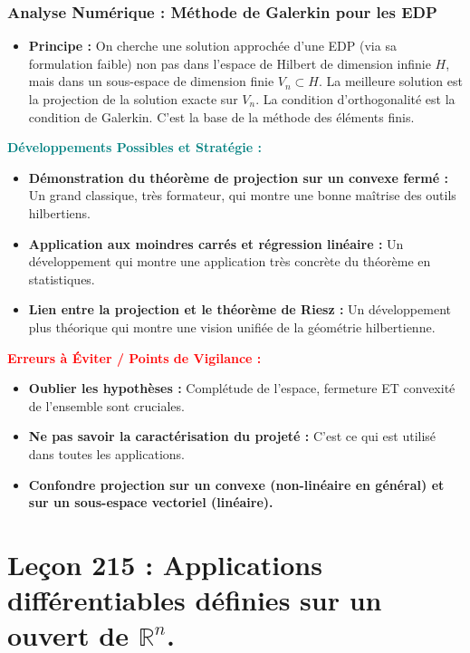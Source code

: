\documentclass[12pt, a4paper, parskip=full]{report}
\theoremstyle{agregstyle}
\newenvironment{developpements}
  {\par\medskip\noindent\begin{oframed}\noindent\textbf{\textcolor{teal}{Développements Possibles et Stratégie :}}}
  {\end{oframed}\par\medskip}
\newenvironment{erreurs}
  {\par\medskip\noindent\begin{oframed}\noindent\textbf{\textcolor{red}{Erreurs à Éviter / Points de Vigilance :}}}
  {\end{oframed}\par\medskip}
\begin{document}
\subsection{Analyse Numérique : Méthode de Galerkin pour les EDP}
\begin{itemize}
    \item \textbf{Principe :} On cherche une solution approchée d'une EDP (via sa formulation faible) non pas dans l'espace de Hilbert de dimension infinie $H$, mais dans un sous-espace de dimension finie $V_n \subset H$. La meilleure solution est la projection de la solution exacte sur $V_n$. La condition d'orthogonalité est la condition de Galerkin. C'est la base de la méthode des éléments finis.
\end{itemize}

\begin{developpements}
    \begin{itemize}
        \item \textbf{Démonstration du théorème de projection sur un convexe fermé :} Un grand classique, très formateur, qui montre une bonne maîtrise des outils hilbertiens.
        \item \textbf{Application aux moindres carrés et régression linéaire :} Un développement qui montre une application très concrète du théorème en statistiques.
        \item \textbf{Lien entre la projection et le théorème de Riesz :} Un développement plus théorique qui montre une vision unifiée de la géométrie hilbertienne.
    \end{itemize}
\end{developpements}

\begin{erreurs}
    \begin{itemize}
        \item \textbf{Oublier les hypothèses :} Complétude de l'espace, fermeture ET convexité de l'ensemble sont cruciales.
        \item \textbf{Ne pas savoir la caractérisation du projeté :} C'est ce qui est utilisé dans toutes les applications.
        \item \textbf{Confondre projection sur un convexe (non-linéaire en général) et sur un sous-espace vectoriel (linéaire).}
    \end{itemize}
\end{erreurs}
\chapter{Leçon 215 : Applications différentiables définies sur un ouvert de $\mathbb{R}^n$.}
\end{document}
